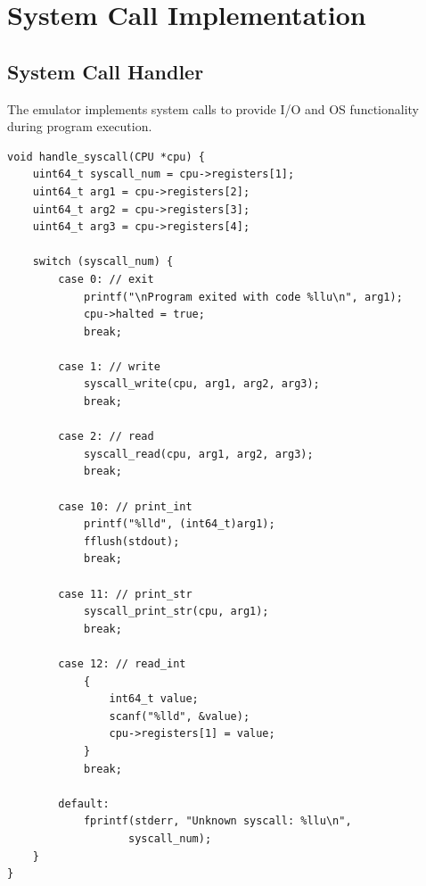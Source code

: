 \documentclass[12pt,a4paper,oneside]{book}
\begin{document}
\chapter{System Call Implementation}

\section{System Call Handler}

The emulator implements system calls to provide I/O and OS functionality during program execution.

\begin{lstlisting}[style=c, caption={System Call Handler}]
void handle_syscall(CPU *cpu) {
    uint64_t syscall_num = cpu->registers[1];
    uint64_t arg1 = cpu->registers[2];
    uint64_t arg2 = cpu->registers[3];
    uint64_t arg3 = cpu->registers[4];
    
    switch (syscall_num) {
        case 0: // exit
            printf("\nProgram exited with code %llu\n", arg1);
            cpu->halted = true;
            break;
            
        case 1: // write
            syscall_write(cpu, arg1, arg2, arg3);
            break;
            
        case 2: // read
            syscall_read(cpu, arg1, arg2, arg3);
            break;
            
        case 10: // print_int
            printf("%lld", (int64_t)arg1);
            fflush(stdout);
            break;
            
        case 11: // print_str
            syscall_print_str(cpu, arg1);
            break;
            
        case 12: // read_int
            {
                int64_t value;
                scanf("%lld", &value);
                cpu->registers[1] = value;
            }
            break;
            
        default:
            fprintf(stderr, "Unknown syscall: %llu\n", 
                   syscall_num);
    }
}
\end{lstlisting}

\end{document}
